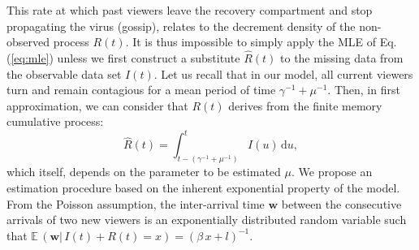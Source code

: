 \documentclass[twoside]{article}
\begin{document}
 This rate at which past viewers leave the recovery compartment and stop propagating the virus (gossip), relates to the decrement density of the non-observed process $R(t)$. It is thus impossible to simply apply the MLE of Eq. (\ref{eq:mle}) unless we first construct a substitute $\widehat{R}(t)$ to the missing data from the observable data set $I(t)$. Let us recall that in our model, all current viewers turn and remain contagious for a mean period of time $\gamma^{-1}+\mu^{-1}$. Then, in first approximation, we can consider that $R(t)$ derives from the finite memory cumulative process: 
\begin{equation}
\widehat{R}(t) = \int_{t-(\gamma^{-1}+\mu^{-1})}^{t} I(u)\, \mathrm{d}u,
\label{eq:estimate-R}
\end{equation}
which itself, depends on the parameter to be estimated $\mu$. 
We propose an estimation procedure based on the inherent exponential property of the model. From the Poisson assumption, the inter-arrival time $\mathbf{w}$ between the consecutive arrivals of two new viewers is an exponentially distributed random variable such that  $\mathbb{E}\,(\mathbf{w}|\,I(t)+R(t)=x) = (\beta\,x+l)^{-1}$. 
\end{document}
